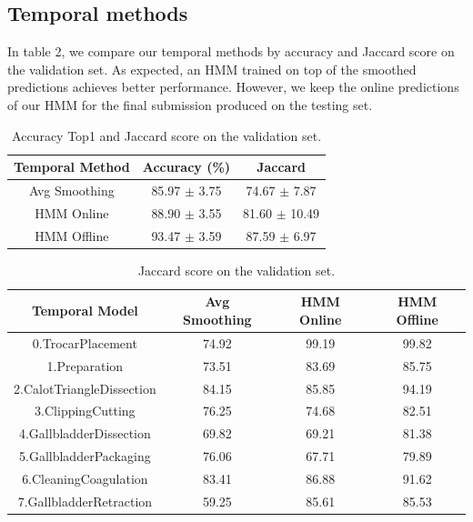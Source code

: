 \documentclass[10pt,twocolumn,letterpaper]{article}
\begin{document}
\subsection{Temporal methods}

In table 2, we compare our temporal methods by accuracy and Jaccard score on the validation set. As expected, an HMM trained on top of the smoothed predictions achieves better performance. However, we keep the online predictions of our HMM for the final submission produced on the testing set.

\begin{table}
	\begin{center}
		\begin{tabular}{|c|c|c|}
			\hline
			Temporal Method & Accuracy (\%) & Jaccard \\
			\hline\hline
			Avg Smoothing & 85.97 $\pm$ 3.75 & 74.67 $\pm$ 7.87\\
			HMM Online & 88.90 $\pm$ 3.55 & 81.60 $\pm$ 10.49\\
			HMM Offline & 93.47 $\pm$ 3.59 & 87.59 $\pm$ 6.97\\
			\hline
		\end{tabular}
	\end{center}
	\caption{Accuracy Top1 and Jaccard score on the validation set.}
\end{table}


\begin{table}
	\begin{center}
		\begin{tabular}{|c|c|c|c|}
			\hline
			Temporal Model & Avg Smoothing & HMM Online & HMM Offline \\
			\hline
			0.TrocarPlacement & 74.92 & 99.19 & 99.82 \\
			1.Preparation & 73.51 & 83.69 & 85.75 \\
			2.CalotTriangleDissection & 84.15 & 85.85 &  94.19 \\
			3.ClippingCutting & 76.25 & 74.68 & 82.51 \\
			4.GallbladderDissection & 69.82 & 69.21 & 81.38 \\
			5.GallbladderPackaging & 76.06 & 67.71 & 79.89 \\
			6.CleaningCoagulation & 83.41 & 86.88 & 91.62 \\
			7.GallbladderRetraction & 59.25 & 85.61 & 85.53 \\
			\hline
		\end{tabular}
	\end{center}
	\caption{Jaccard score on the validation set.}
\end{table}
\end{document}
